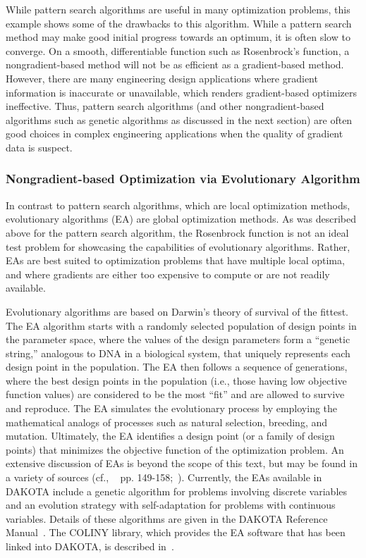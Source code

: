 While pattern search algorithms are useful in many optimization
problems, this example shows some of the drawbacks to this algorithm.
While a pattern search method may make good initial progress towards
an optimum, it is often slow to converge. On a smooth, differentiable
function such as Rosenbrock's function, a nongradient-based method
will not be as efficient as a gradient-based method. However, there
are many engineering design applications where gradient information is
inaccurate or unavailable, which renders gradient-based optimizers
ineffective. Thus, pattern search algorithms (and other
nongradient-based algorithms such as genetic algorithms as discussed in the
next section) are often good choices in complex engineering applications
when the quality of gradient data is suspect.

\subsubsection{Nongradient-based Optimization via Evolutionary Algorithm}\label{tutorial:example:optimization:nongradient2}

In contrast to pattern search algorithms, which are local optimization
methods, evolutionary algorithms (EA) are global optimization
methods. As was described above for the pattern search algorithm, the
Rosenbrock function is not an ideal test problem for showcasing the
capabilities of evolutionary algorithms. Rather, EAs are best suited
to optimization problems that have multiple local optima, and where
gradients are either too expensive to compute or are not readily available.

Evolutionary algorithms are based on Darwin's theory of survival of
the fittest. The EA algorithm starts with a randomly selected
population of design points in the parameter space, where the values
of the design parameters form a ``genetic string,'' analogous
to DNA in a biological system, that uniquely represents each design
point in the population. The EA then follows a sequence of
generations, where the best design points in the population (i.e.,
those having low objective function values) are considered to be the
most ``fit'' and are allowed to survive and reproduce. The EA
simulates the evolutionary process by employing the mathematical
analogs of processes such as natural selection, breeding, and
mutation. Ultimately, the EA identifies a design point (or a family of
design points) that minimizes the objective function of the
optimization problem. An extensive discussion of EAs is beyond the
scope of this text, but may be found in a variety of sources (cf.,
~\cite{Haf92} pp. 149-158;~\cite{Gol89}). Currently, the EAs available
in DAKOTA include a genetic algorithm for problems involving discrete
variables and an evolution strategy with self-adaptation for problems
with continuous variables. Details of these algorithms are given in
the DAKOTA Reference Manual~\cite{RefMan}. The COLINY library, which
provides the EA software that has been linked into DAKOTA, is
described in~\cite{Har06}.

